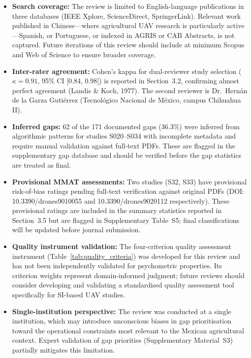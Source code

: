 \documentclass[review,3p,times]{elsarticle}
\begin{document}
\begin{itemize}
  \item \textbf{Search coverage:} The review is limited to English-language publications in three databases (IEEE Xplore, ScienceDirect, SpringerLink). Relevant work published in Chinese---where agricultural UAV research is particularly active---Spanish, or Portuguese, or indexed in AGRIS or CAB Abstracts, is not captured. Future iterations of this review should include at minimum Scopus and Web of Science to ensure broader coverage.
  \item \textbf{Inter-rater agreement:} Cohen's kappa for dual-reviewer study selection ($\kappa=0.91$, 95\% CI [0.84, 0.98]) is reported in Section~3.2, confirming almost perfect agreement (Landis \& Koch, 1977). The second reviewer is Dr.\ Hernán de la Garza Gutiérrez (Tecnológico Nacional de México, campus Chihuahua II).
  \item \textbf{Inferred gaps:} 62 of the 171 documented gaps (36.3\%) were inferred from algorithmic patterns for studies S020--S034 with incomplete metadata and require manual validation against full-text PDFs. These are flagged in the supplementary gap database and should be verified before the gap statistics are treated as final.
  \item \textbf{Provisional MMAT assessments:} Two studies (S32, S33) have provisional risk-of-bias ratings pending full-text verification against original PDFs (DOI: 10.3390/drones9010055 and 10.3390/drones9020112 respectively). These provisional ratings are included in the summary statistics reported in Section~3.5 but are flagged in Supplementary Table~S5; final classifications will be updated before journal submission.
  \item \textbf{Quality instrument validation:} The four-criterion quality assessment instrument (Table~\ref{tab:quality_criteria}) was developed for this review and has not been independently validated for psychometric properties. Its criterion weights represent domain-informed judgment; future reviews should consider developing and validating a standardised quality assessment tool specifically for SI-based UAV studies.
  \item \textbf{Single-institution perspective:} The review was conducted at a single institution, which may introduce unconscious biases in gap prioritisation toward the operational constraints most relevant to the Mexican agricultural context. Expert validation of gap priorities (Supplementary Material~S3) partially mitigates this limitation.
\end{itemize}
\end{document}
